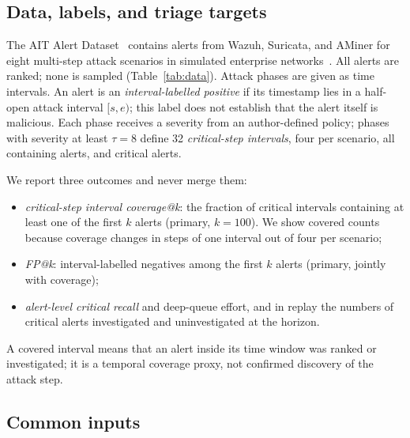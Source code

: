 \documentclass[pdflatex,sn-basic,Numbered]{sn-jnl}
\begin{document}
\subsection{Data, labels, and triage targets}

The AIT Alert Dataset~\citep{AITAlertDataset2023,Landauer2024AITADS} contains alerts from Wazuh, Suricata, and AMiner for eight multi-step attack scenarios in simulated enterprise networks~\citep{Landauer2023MaintainableLogs}. All \NAlerts{} alerts are ranked; none is sampled (Table~\ref{tab:data}). Attack phases are given as time intervals. An alert is an \emph{interval-labelled positive} if its timestamp lies in a half-open attack interval $[s,e)$; this label does not establish that the alert itself is malicious. Each phase receives a severity from an author-defined policy; phases with severity at least $\tau=8$ define 32 \emph{critical-step intervals}, four per scenario, all containing alerts, and \NCriticalAlerts{} critical alerts.

\begin{tableorg}[t]
\centering
\caption{Held-out scenarios. Mapped: share of alerts whose native identifier is mapped to an attack phase by the outer training scenarios (label-free for the held-out scenario). Unseen-identifier alerts: alerts whose (detector, native key) never occurs in the training scenarios.}
\label{tab:data}
\resizebox{\textwidth}{!}{}
\end{tableorg}

We report three outcomes and never merge them:
\begin{itemize}[leftmargin=*]
\item \emph{critical-step interval coverage@k}: the fraction of critical intervals containing at least one of the first $k$ alerts (primary, $k=100$). We show covered counts because coverage changes in steps of one interval out of four per scenario;
\item \emph{FP@k}: interval-labelled negatives among the first $k$ alerts (primary, jointly with coverage);
\item \emph{alert-level critical recall} and deep-queue effort, and in replay the numbers of critical alerts investigated and uninvestigated at the horizon.
\end{itemize}
A covered interval means that an alert inside its time window was ranked or investigated; it is a temporal coverage proxy, not confirmed discovery of the attack step.

\subsection{Common inputs}
\label{subsec:inputs}
\end{document}
